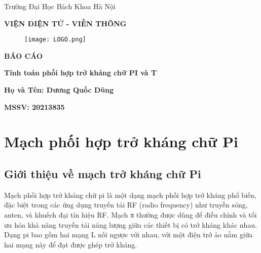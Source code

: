 \documentclass{article}
\begin{document}
\begin{titlepage}
    \centering
    \vspace{0.5cm}

    \LARGE
    Trường Đại Học Bách Khoa Hà Nội

    \LARGE
    \textbf{VIỆN ĐIỆN TỬ - VIỄN THÔNG}
    

\begin{figure}[ht]
    \centering
    \texttt{[image: LOGO.png]}
    \label{fig:ten_label}
\end{figure}


    \vspace{1cm}

    \textbf{BÁO CÁO}

    \vspace{0.2cm}
    \LARGE
    \textbf{\fontsize{19}{24}\selectfont Tính toán phối hợp trở kháng chữ PI và T}

    \vspace{0.2cm}
    \LARGE

    \begin{center}
        
    
    \textbf{Họ và Tên: Dương Quốc Dũng }
    
    \textbf{MSSV: 20213835}
    
    \end{center}
    
   

\end{titlepage}



\tableofcontents
\listoffigures
\newpage


\section{Mạch phối hợp trở kháng chữ Pi}
\subsection{Giới thiệu về mạch trở kháng chữ Pi }
Mạch phối hợp trở kháng chữ pi là một dạng mạch phối hợp trở kháng phổ biến, đặc biệt trong các ứng dụng truyền tải RF (radio frequency) như truyền sóng, anten, và khuếch đại tín hiệu RF. Mạch π thường được dùng để điều chỉnh và tối ưu hóa khả năng truyền tải năng lượng giữa các thiết bị có trở kháng khác nhau.
Dạng pi bao gồm hai mạng L nối ngược với nhau, với một điện trở ảo nằm giữa hai mạng này để đạt được ghép trở kháng.
\end{document}
